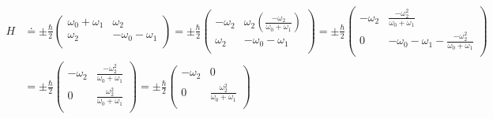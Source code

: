 \documentclass[10pt]{article} %
\begin{document}
\begin{align*}
  H &\doteq
  \pm\frac{\hbar}{2}
  \begin{pmatrix}
    \omega_0 + \omega_1 & \omega_2\\
    \omega_2 & -\omega_0 - \omega_1\\
  \end{pmatrix}
  =
  \pm\frac{\hbar}{2}
  \begin{pmatrix}
    -\omega_2 & \omega_2\left(\frac{-\omega_2}{\omega_0 + \omega_1}\right)\\
    \omega_2 & -\omega_0 - \omega_1\\
  \end{pmatrix}
  =
  \pm\frac{\hbar}{2}
  \begin{pmatrix}
    -\omega_2 & \frac{-\omega_2^2}{\omega_0 + \omega_1}\\
    0 & -\omega_0 - \omega_1 - \frac{-\omega_2^2}{\omega_0 + \omega_1}\\
  \end{pmatrix}\\
  &=
  \pm\frac{\hbar}{2}
  \begin{pmatrix}
    -\omega_2 & \frac{-\omega_2^2}{\omega_0 + \omega_1}\\
    0 & \frac{\omega_2^2}{\omega_0 + \omega_1}\\
  \end{pmatrix}
  =
  \pm\frac{\hbar}{2}
  \begin{pmatrix}
    -\omega_2 & 0\\
    0 & \frac{\omega_2^2}{\omega_0 + \omega_1}\\
  \end{pmatrix}
\end{align*}
\end{document}
